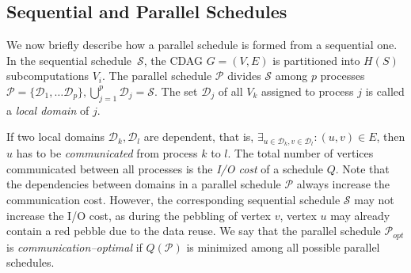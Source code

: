 \documentclass[sigplan,review,anonymous,10pt]{acmart}\settopmatter{printfolios=true,printccs=false,printacmref=false}
\newcommand\mac[1]{\textcolor{red}{[Mac: #1]}}
\begin{document}


\subsection{Sequential and Parallel Schedules}
\label{sec:seqpar}

We now briefly describe how a parallel schedule is formed from a sequential 
one. In the sequential
schedule~$\mathcal{S}$, the CDAG $G = (V,E)$ is partitioned into $H(S)$
subcomputations $V_i$. The parallel schedule $\mathcal{P}$ divides
$\mathcal{S}$ among $p$ processes $\mathcal{P} = \{\mathcal{D}_1, \dots
\mathcal{D}_p\}, \bigcup_{j=1}^p \mathcal{D}_j = \mathcal{S}$. The set
$\mathcal{D}_j$ of all $V_k$ assigned to process $j$ is called a \emph{local
domain} of $j$.

If two local domains $\mathcal{D}_k, \mathcal{D}_l$ are dependent, that is,
\linebreak $\exists_{u \in \mathcal{D}_k, v \in \mathcal{D}_l} : (u,v) \in E$,
then $u$ has to be \emph{communicated} from process $k$ to $l$. The total
number of vertices communicated between all processes is the \emph{I/O cost} of
a schedule $Q$.  Note that the dependencies between domains in a parallel
schedule $\mathcal{P}$ always increase the communication cost. However, the
corresponding sequential schedule $\mathcal{S}$ may not increase the I/O cost,
as during the pebbling of vertex $v$, vertex $u$ may already contain a red
pebble due to the data reuse.  We say that the parallel schedule
$\mathcal{P}_{opt}$ is
\emph{communication--optimal} if $Q(\mathcal{P})$ is minimized among all
possible parallel schedules. 

\end{document}

